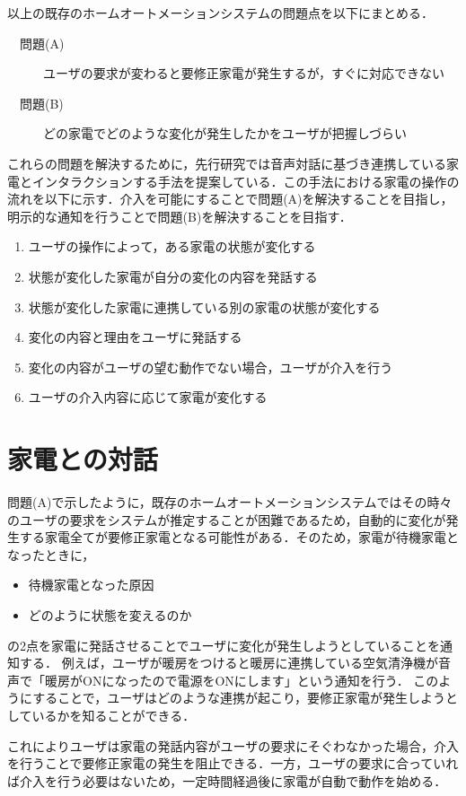\documentclass[a4j,12pt,twoside]{jreport}
\begin{document}
以上の既存のホームオートメーションシステムの問題点を以下にまとめる．
\begin{description}
	\item [　問題(A)]ユーザの要求が変わると要修正家電が発生するが，すぐに対応できない
	\item [　問題(B)]どの家電でどのような変化が発生したかをユーザが把握しづらい
\end{description}

これらの問題を解決するために，先行研究では音声対話に基づき連携している家電とインタラクションする手法を提案している．この手法における家電の操作の流れを以下に示す．介入を可能にすることで問題(A)を解決することを目指し，明示的な通知を行うことで問題(B)を解決することを目指す．
\begin{enumerate}
	\item ユーザの操作によって，ある家電の状態が変化する
	\item 状態が変化した家電が自分の変化の内容を発話する
	\item 状態が変化した家電に連携している別の家電の状態が変化する
	\item 変化の内容と理由をユーザに発話する
	\item 変化の内容がユーザの望む動作でない場合，ユーザが介入を行う
	\item ユーザの介入内容に応じて家電が変化する
\end{enumerate}
\section{家電との対話}
\label{sec:対話}
問題(A)で示したように，既存のホームオートメーションシステムではその時々のユーザの要求をシステムが推定することが困難であるため，自動的に変化が発生する家電全てが要修正家電となる可能性がある．そのため，家電が待機家電となったときに，
\begin{itemize}
	\item 待機家電となった原因
	\item どのように状態を変えるのか
\end{itemize}
の2点を家電に発話させることでユーザに変化が発生しようとしていることを通知する．
例えば，ユーザが暖房をつけると暖房に連携している空気清浄機が音声で「暖房がONになったので電源をONにします」という通知を行う．
このようにすることで，ユーザはどのような連携が起こり，要修正家電が発生しようとしているかを知ることができる．

これによりユーザは家電の発話内容がユーザの要求にそぐわなかった場合，介入を行うことで要修正家電の発生を阻止できる．一方，ユーザの要求に合っていれば介入を行う必要はないため，一定時間経過後に家電が自動で動作を始める．
\end{document}
